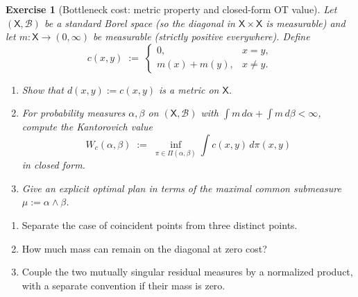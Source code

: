 \documentclass[11pt,a4paper]{article}
\theoremstyle{exostyle}
\newtheorem{exercise}{Exercise}
\begin{document}
\begin{exercise}[Bottleneck cost: metric property and closed-form OT value]\label{ex:bottleneck_positive}
Let $(\mathsf X,\mathcal B)$ be a standard Borel space (so the diagonal in $\mathsf X\times\mathsf X$ is measurable) and let $m:\mathsf X\to(0,\infty)$ be measurable (strictly positive everywhere).
Define
\[
c(x,y)\;:=\;\begin{cases}
0,& x=y,\\[2pt]
m(x)+m(y),& x\neq y.
\end{cases}
\]
\begin{enumerate}[label=(\alph*),itemsep=4pt]
\item Show that $d(x,y):=c(x,y)$ is a metric on $\mathsf X$.
\item For probability measures $\alpha,\beta$ on $(\mathsf X,\mathcal B)$ with $\int m\,d\alpha+\int m\,d\beta<\infty$, compute the Kantorovich value
\[
W_c(\alpha,\beta)\;:=\;\inf_{\pi\in\Pi(\alpha,\beta)}\int c(x,y)\,d\pi(x,y)
\]
in closed form.
\item Give an explicit optimal plan in terms of the maximal common submeasure $\mu:=\alpha\wedge\beta$.
\end{enumerate}
\end{exercise}
\begin{hints}
\begin{enumerate}[label=(\alph*)]\item Separate the case of coincident points from three distinct points.\item How much mass can remain on the diagonal at zero cost?\item Couple the two mutually singular residual measures by a normalized product, with a separate convention if their mass is zero.\end{enumerate}
\end{hints}
\end{document}
